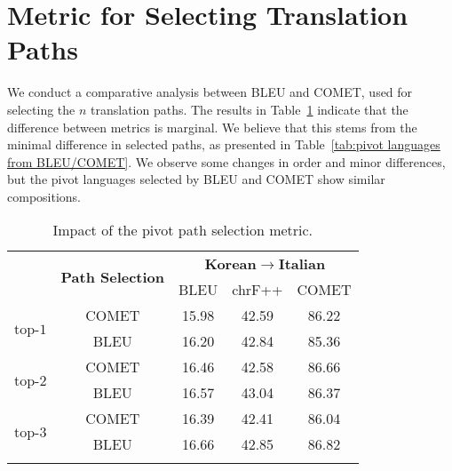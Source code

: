 \section{Metric for Selecting Translation Paths}
\label{apdx: Metric for Selecting Translation Paths}

We conduct a comparative analysis between BLEU and COMET, used for selecting the $n$ translation paths.
The results in Table~\ref{tab:ensemble results from BLEU/COMET} indicate that the difference between metrics is marginal.
We believe that this stems from the minimal difference in selected paths, as presented in Table~\ref{tab:pivot languages from BLEU/COMET}.
We observe some changes in order and minor differences, but the pivot languages selected by BLEU and COMET show similar compositions.



\begin{table}[!h]
\centering
\small
\renewcommand{\arraystretch}{1.0}
\begin{adjustbox}{width=\columnwidth, center}
\begin{tabular}{lcccc}
\Xhline{3\arrayrulewidth}

\multirow{2}{*}{\textbf{top-$\textit{k}$}} & \multirow{2}{*}{\textbf{Path Selection}} & \multicolumn{3}{c}{\textbf{Korean$\rightarrow$Italian}}\\ \cline{3-5}
& & BLEU & chrF++ & COMET \\ \hline\hline 
\multirow{2}{*}{top-$\textit{1}$} & COMET	&15.98	&42.59	&86.22 \\
& BLEU	&16.20 &	42.84	&85.36 \\
\multirow{2}{*}{top-$\textit{2}$} & COMET	&16.46&	42.58&	86.66 \\
& BLEU	&16.57	&43.04&	86.37 \\
\multirow{2}{*}{top-$\textit{3}$} & COMET	&16.39&	42.41&	86.04 \\
& BLEU	&16.66	&42.85&	86.82 \\

\Xhline{3\arrayrulewidth}
\end{tabular}
\end{adjustbox}
\caption{Impact of the pivot path selection metric.}
\label{tab:ensemble results from BLEU/COMET}
\end{table}




